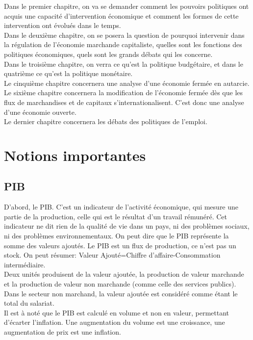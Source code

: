 \documentclass[10pt, a4paper, openany]{book}
\begin{document}
Dans le premier chapitre, on va se demander comment les pouvoirs politiques ont acquis une capacité d'intervention économique et comment les formes de cette intervention ont évolués dans le temps. \\
Dans le deuxième chapitre, on se posera la question de pourquoi intervenir dans la régulation de l'économie marchande capitaliste, quelles sont les fonctions des politiques économiques, quels sont les grands débats qui les concerne. \\
Dans le troisième chapitre, on verra ce qu'est la politique budgétaire, et dans le quatrième ce qu'est la politique monétaire. \\
Le cinquième chapitre concernera une analyse d'une économie fermée en autarcie. \\
Le sixième chapitre concernera la modification de l'économie fermée dès que les flux de marchandises et de capitaux s'internationalisent. C'est donc une analyse d'une économie ouverte. \\
Le dernier chapitre concernera les débats des politiques de l'emploi. 

\section{Notions importantes}

\subsection{PIB}

D'abord, le PIB. C'est un indicateur de l'activité économique, qui mesure une partie de la production, celle qui est le résultat d'un travail rémunéré. Cet indicateur ne dit rien de la qualité de vie dans un pays, ni des problèmes sociaux, ni des problèmes environnementaux. On peut dire que le PIB représente la somme des valeurs ajoutés. Le PIB est un flux de production, ce n'est pas un stock. On peut résumer: Valeur Ajouté=Chiffre d'affaire-Consommation intermédiaire. \\
Deux unités produisent de la valeur ajoutée, la production de valeur marchande et la production de valeur non marchande (comme celle des services publics). Dans le secteur non marchand, la valeur ajoutée est considéré comme étant le total du salariat. \\
Il est à noté que le PIB est calculé en volume et non en valeur, permettant d'écarter l'inflation. Une augmentation du volume est une croissance, une augmentation de prix est une inflation.
\end{document}
